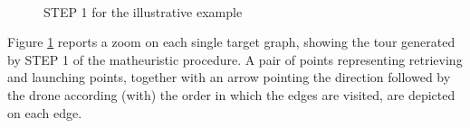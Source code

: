 \begin{figure}[h!]
    \centering
    \qquad
     \qquad
     \\
    \qquad
    \caption{STEP 1 for the illustrative example}%
    \label{fig:example2}%
\end{figure}

\noindent
Figure \ref{fig:example2} reports a zoom on each single target graph, showing the tour generated by STEP 1 of the matheuristic procedure. A pair of points representing retrieving and launching points,  together with an arrow pointing the direction followed by the drone according (with)  the order in which the edges are visited, are depicted on each edge.

